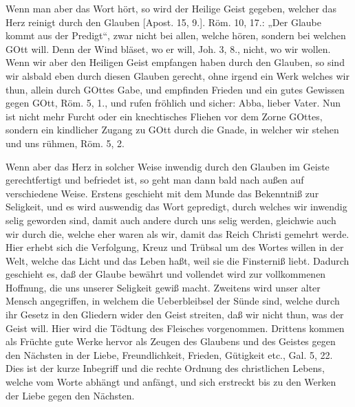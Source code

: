 Wenn man aber das Wort hört, so wird der Heilige Geist gegeben, welcher das Herz reinigt durch den Glauben [Apost. 15, 9.]. Röm. 10, 17.: „Der Glaube kommt aus der Predigt“, zwar nicht bei allen, welche hören, sondern bei welchen GOtt will. Denn der Wind bläset, wo er will, Joh. 3, 8., nicht, wo wir wollen. Wenn wir aber den Heiligen Geist empfangen haben durch den Glauben, so sind wir alsbald eben durch diesen Glauben gerecht, ohne irgend ein Werk welches wir thun, allein durch GOttes Gabe, und empfinden Frieden und ein gutes Gewissen gegen GOtt, Röm. 5, 1., und rufen fröhlich und sicher: Abba, lieber Vater. Nun ist nicht mehr Furcht oder ein knechtisches Fliehen vor dem Zorne GOttes, sondern ein kindlicher Zugang zu GOtt durch die Gnade, in welcher wir stehen und uns rühmen, Röm. 5, 2.

Wenn aber das Herz in solcher Weise inwendig durch den Glauben im Geiste gerechtfertigt und befriedet ist, so geht man dann bald nach außen auf verschiedene Weise. Erstens geschieht mit dem Munde das Bekenntniß zur Seligkeit, und es wird auswendig das Wort gepredigt, durch welches wir inwendig selig geworden sind, damit auch andere durch uns selig werden, gleichwie auch wir durch die, welche eher waren als wir, damit das Reich Christi gemehrt werde. Hier erhebt sich die Verfolgung, Kreuz und Trübsal um des Wortes willen in der Welt, welche das Licht und das Leben haßt, weil sie die Finsterniß liebt. Dadurch geschieht es, daß der Glaube bewährt und vollendet wird zur vollkommenen Hoffnung, die uns unserer Seligkeit gewiß macht. Zweitens wird unser alter Mensch angegriffen, in welchem die Ueberbleibsel der Sünde sind, welche durch ihr Gesetz in den Gliedern wider den Geist streiten, daß wir nicht thun, was der Geist will. Hier wird die Tödtung des Fleisches vorgenommen. Drittens kommen als Früchte gute Werke hervor als Zeugen des Glaubens und des Geistes gegen den Nächsten in der Liebe, Freundlichkeit, Frieden, Gütigkeit etc., Gal. 5, 22. Dies ist der kurze Inbegriff und die rechte Ordnung des christlichen Lebens, welche vom Worte abhängt und anfängt, und sich erstreckt bis zu den Werken der Liebe gegen den Nächsten.

